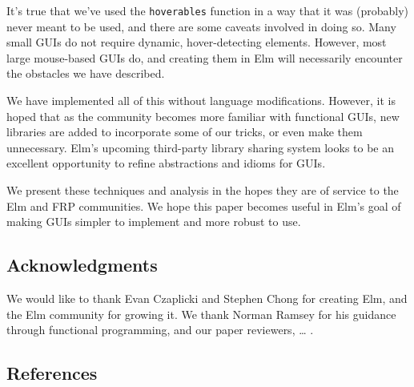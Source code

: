 \documentclass{article}
\begin{document}
It's true that we've used the \texttt{hoverables} function in a way that
it was (probably) never meant to be used, and there are some caveats
involved in doing so. Many small GUIs do not require dynamic,
hover-detecting elements. However, most large mouse-based GUIs do, and
creating them in Elm will necessarily encounter the obstacles we have
described.

We have implemented all of this without language modifications. However,
it is hoped that as the community becomes more familiar with functional
GUIs, new libraries are added to incorporate some of our tricks, or even
make them unnecessary. Elm's upcoming third-party library sharing system
looks to be an excellent opportunity to refine abstractions and idioms
for GUIs.

We present these techniques and analysis in the hopes they are of
service to the Elm and FRP communities. We hope this paper becomes
useful in Elm's goal of making GUIs simpler to implement and more robust
to use.

\subsection{Acknowledgments}\label{acknowledgments}

We would like to thank Evan Czaplicki and Stephen Chong for creating
Elm, and the Elm community for growing it. We thank Norman Ramsey for
his guidance through functional programming, and our paper reviewers,
\ldots{} .

\subsection{References}\label{references}
\end{document}
